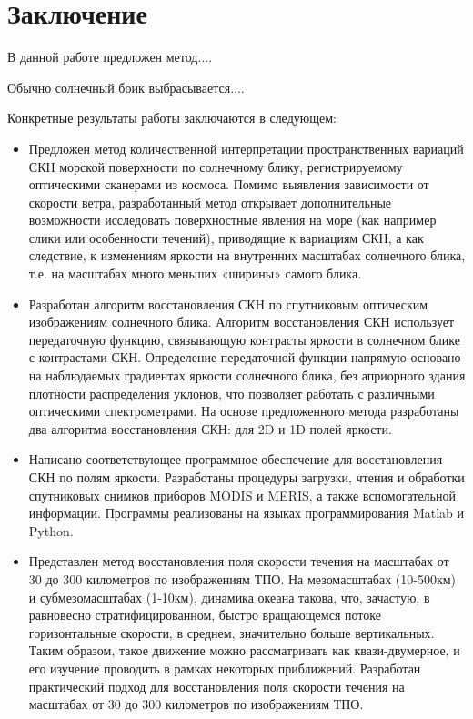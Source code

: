 \chapter*{Заключение}						%

В данной работе предложен метод....

Обычно солнечный боик выбрасывается....

Конкретные результаты работы заключаются в следующем:

\begin{itemize}

\item Предложен метод количественной интерпретации пространственных вариаций СКН морской поверхности по солнечному блику, регистрируемому оптическими сканерами из космоса. Помимо выявления зависимости от скорости ветра, разработанный метод открывает дополнительные возможности исследовать поверхностные явления на море (как например слики или особенности течений), приводящие к вариациям СКН, а как следствие, к изменениям яркости на внутренних масштабах солнечного блика, т.е. на масштабах много меньших «ширины» самого блика.

\item Разработан алгоритм восстановления СКН по спутниковым оптическим изображениям солнечного блика. Алгоритм восстановления СКН использует передаточную функцию, связывающую контрасты яркости в солнечном блике с контрастами СКН. Определение передаточной функции напрямую основано на наблюдаемых градиентах яркости солнечного блика, без априорного здания плотности распределения уклонов, что позволяет работать с различными оптическими спектрометрами. На основе предложенного метода разработаны два алгоритма восстановления СКН: для 2D и 1D полей яркости.

\item Написано соответствующее программное обеспечение для восстановления СКН по полям яркости. Разработаны процедуры загрузки, чтения и обработки спутниковых снимков приборов MODIS и MERIS, а также вспомогательной информации. Программы реализованы на языках программирования Matlab и Python.

\item Представлен метод восстановления поля скорости течения на масштабах от 30 до 300 километров по изображениям ТПО. На мезомасштабах (10-500км) и субмезомасштабах (1-10км), динамика океана такова, что, зачастую, в равновесно стратифицированном, быстро вращающемся потоке горизонтальные скорости, в среднем, значительно больше вертикальных. Таким образом, такое движение можно рассматривать как квази-двумерное, и его изучение проводить в рамках некоторых приближений. Разработан практический подход для восстановления поля скорости течения на масштабах от 30 до 300 километров по изображениям ТПО.


\end{itemize}
